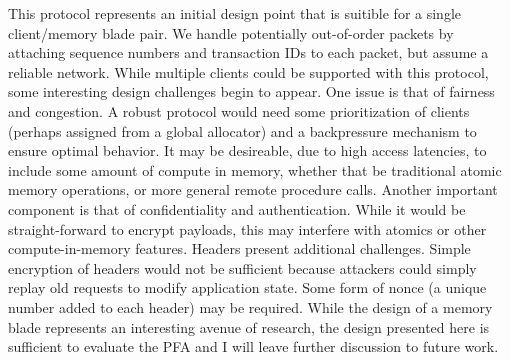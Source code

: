 This protocol represents an initial design point that is suitible for a single
client/memory blade pair. We handle potentially out-of-order packets by
attaching sequence numbers and transaction IDs to each packet, but assume a
reliable network. While multiple clients could be supported with this protocol,
some interesting design challenges begin to appear. One issue is that of
fairness and congestion. A robust protocol would need some prioritization of
clients (perhaps assigned from a global allocator) and a backpressure mechanism
to ensure optimal behavior. It may be desireable, due to high access latencies,
to include some amount of compute in memory, whether that be traditional atomic
memory operations, or more general remote procedure calls. Another important component is that of
confidentiality and authentication. While it would be straight-forward to
encrypt payloads, this may interfere with atomics or other compute-in-memory
features. Headers present additional challenges. Simple encryption of headers
would not be sufficient because attackers could simply replay old requests to
modify application state. Some form of nonce (a unique number added to each
header) may be required. While the design of a memory blade represents an
interesting avenue of research, the design presented here is sufficient to
evaluate the PFA and I will leave further discussion to future work.

